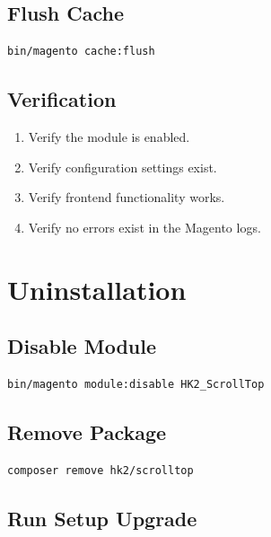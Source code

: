 \documentclass[11pt,a4paper]{article}
\begin{document}
\subsection{Flush Cache}

\begin{lstlisting}[style=shell]
bin/magento cache:flush
\end{lstlisting}

\subsection{Verification}

\begin{enumerate}
    \item Verify the module is enabled.
    \item Verify configuration settings exist.
    \item Verify frontend functionality works.
    \item Verify no errors exist in the Magento logs.
\end{enumerate}

\section{Uninstallation}

\subsection{Disable Module}

\begin{lstlisting}[style=shell]
bin/magento module:disable HK2_ScrollTop
\end{lstlisting}

\subsection{Remove Package}

\begin{lstlisting}[style=shell]
composer remove hk2/scrolltop
\end{lstlisting}

\subsection{Run Setup Upgrade}
\end{document}
